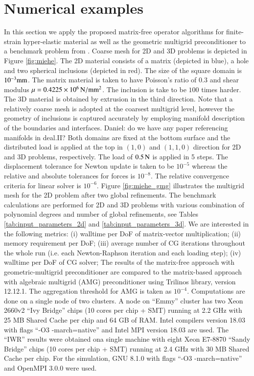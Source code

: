 \documentclass[preprint,12pt,times]{elsarticle}
\begin{document}
\section{Numerical examples}
\label{sec:example}

In this section we apply the proposed matrix-free operator algorithms for finite-strain hyper-elastic material as well as the geometric multigrid preconditioner to a benchmark problem from \cite{Miehe2007}. Coarse mesh for 2D and 3D problems is depicted in Figure \ref{fig:miehe}. The 2D material consists of a matrix (depicted in blue), a hole and two spherical inclusions (depicted in red). The size of the square domain is $10^{-3} \rm{mm}$.
The matrix material is taken to have Poisson's ratio of $0.3$ and shear modulus $\mu=0.4225 \times 10^6\, \rm{N/mm^2}$. The inclusion is take to be $100$ times harder.
The 3D material is obtained by extrusion in the third direction.
Note that a relatively coarse mesh is adopted at the coarsest multigrid level, however the geometry of inclusions is captured accurately by employing manifold description of the boundaries and interfaces.
{\color{red}Daniel: do we have any paper referencing manifolds in deal.II?}
Both domains are fixed at the bottom surface and the distributed load is applied at the top in $(1,0)$ and $(1,1,0)$ direction for 2D and 3D problems, respectively.
The load of $0.5\,\rm{N}$ is applied in 5 steps. The displacement tolerance for Newton update is taken to be $10^{-5}$ whereas the relative and absolute tolerances for forces is $10^{-8}$. The relative convergence criteria for linear solver is $10^{-6}$.
%
Figure \ref{fig:miehe_gmg} illustrates the multigrid mesh for the 2D problem after two global refinements.
%
The benchmark calculations are performed for 2D and 3D problems with various combination of polynomial degrees and number of global refinements, see Tables \ref{tab:input_parameters_2d} and \ref{tab:input_parameters_3d}.
%
We are interested in the following metrics:
(i) walltime per DoF of matrix-vector multiplication;
(ii) memory requirement per DoF;
(iii) average number of CG iterations throughout the whole run (i.e. each Newton-Raphson iteration and each loading step);
(iv) walltime per DoF of CG solver;
%
The results of the matrix-free approach with geometric-multigrid preconditioner are compared to the matrix-based approach with algebraic multigrid (AMG) preconditioner using Trilinos \cite{Heroux2005} library, version 12.12.1.
The aggregation threshold for AMG is taken as $10^{-4}$.
Computations are done on a single node of two clusters.
A node on ``Emmy'' cluster has two Xeon 2660v2 ``Ivy Bridge'' chips (10 cores per chip + SMT) running at 2.2 GHz with 25 MB Shared Cache per chip and 64 GB of RAM. Intel compilers version 18.03 with flags ``-O3 -march=native'' and Intel MPI version 18.03 are used.
The ``IWR'' results were obtained ona single machine with eight Xeon E7-8870 ``Sandy Bridge'' chips (10 cores per chip  + SMT) running at 2.4 GHz with 30 MB Shared Cache per chip. For the simulation, GNU 8.1.0 with flags ``-O3 -march=native'' and OpenMPI 3.0.0 were used.
\end{document}
